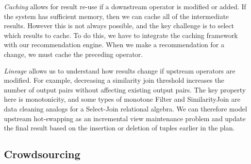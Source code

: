 \textit{Caching} allows for result re-use if a downstream operator is modified or added.
If the system has sufficient memory, then we can cache all of the intermediate results. 
However this is not always possible, and the key challenge is to select which results to cache.
To do this, we have to integrate the caching framework with our recommendation engine.
When we make a recommendation for a change, we must cache the preceding operator. 

\vspace{.5em}

\textit{Lineage} allows us to understand how results change if upstream operators are modified.
For example, decreasing a similarity join threshold increases the number of output pairs without affecting existing output pairs. The key property here is monotonicity, and some types of monotone \textsf{Filter} and \textsf{SimilarityJoin} are data cleaning analogs for a Select-Join relational algebra.
We can therefore model upstream hot-swapping as an incremental view maintenance problem and update the 
final result based on the insertion or deletion of tuples earlier in the plan.

\iffalse
\vspace{.5em}



\fi



\vspace{-0.2cm}
\subsection{Crowdsourcing}
\vspace{.2em}

